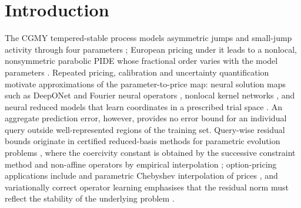 \documentclass[hidelinks]{siamart251216}
\begin{document}
\section{Introduction}
\label{sec:introduction}
The CGMY tempered-stable process models asymmetric jumps and small-jump activity through four
parameters \cite{CarrGemanMadanYor2002}; European pricing under it leads to a nonlocal,
nonsymmetric parabolic PIDE whose fractional order varies with the model parameters
\cite{CarteadelCastilloNegrete2007}.  Repeated pricing, calibration and uncertainty
quantification motivate approximations of the parameter-to-price map: neural solution maps such as
DeepONet \cite{LuJinPangZhangKarniadakis2021} and Fourier neural operators
\cite{LiKovachkiEtAl2021,KovachkiEtAl2023}, nonlocal kernel networks
\cite{YouYuDEliaGaoSilling2022}, and neural reduced models that learn coordinates in a prescribed
trial space \cite{HesthavenUbbiali2018,BhattacharyaEtAl2021}.  An aggregate prediction error,
however, provides no error bound for an individual query outside well-represented regions of the
training set.  Query-wise residual bounds originate in certified reduced-basis methods for
parametric evolution problems \cite{GreplPatera2005,RozzaHuynhPatera2008,HaasdonkOhlberger2008},
where the coercivity constant is obtained by the successive constraint method
\cite{HuynhRozzaSenPatera2007} and non-affine operators by empirical interpolation
\cite{BarraultMadayNguyenPatera2004,GreplMadayNguyenPatera2007}; option-pricing applications
include \cite{ContLantosPironneau2011,BurkovskaHaasdonkSalomonWohlmuth2015} and parametric
Chebyshev interpolation of prices \cite{GassGlauMahlstedtMair2018}, and variationally correct
operator learning emphasises that the residual norm must reflect the stability of the underlying
problem \cite{QiuDahmenChen2026}.
\end{document}

